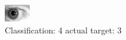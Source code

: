 \begin{figure}[h!]
\begin{center}
\includegraphics[width=0.60\columnwidth]{figures/ID285_class_4_target_3.png}
\end{center}
\caption{ Classification: 4 actual target: 3}
\label{fig:ID285_class_4_target_3}
\end{figure}
